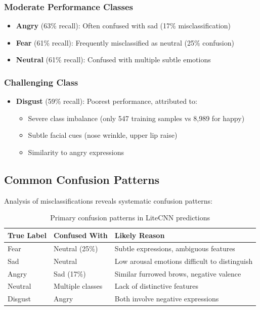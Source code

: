 \documentclass[12pt,a4paper]{article}
\begin{document}
\subsubsection{Moderate Performance Classes}
\begin{itemize}[leftmargin=*]
    \item \textbf{Angry} (63\% recall): Often confused with sad (17\% misclassification)
    \item \textbf{Fear} (61\% recall): Frequently misclassified as neutral (25\% confusion)
    \item \textbf{Neutral} (61\% recall): Confused with multiple subtle emotions
\end{itemize}

\subsubsection{Challenging Class}
\begin{itemize}[leftmargin=*]
    \item \textbf{Disgust} (59\% recall): Poorest performance, attributed to:
    \begin{itemize}
        \item Severe class imbalance (only 547 training samples vs 8,989 for happy)
        \item Subtle facial cues (nose wrinkle, upper lip raise)
        \item Similarity to angry expressions
    \end{itemize}
\end{itemize}

\subsection{Common Confusion Patterns}
Analysis of misclassifications reveals systematic confusion patterns:

\begin{table}[h!]
\centering
\begin{tabular}{lll}
\toprule
True Label & Confused With & Likely Reason \\
\midrule
Fear & Neutral (25\%) & Subtle expressions, ambiguous features \\
Sad & Neutral & Low arousal emotions difficult to distinguish \\
Angry & Sad (17\%) & Similar furrowed brows, negative valence \\
Neutral & Multiple classes & Lack of distinctive features \\
Disgust & Angry & Both involve negative expressions \\
\bottomrule
\end{tabular}
\caption{Primary confusion patterns in LiteCNN predictions}
\label{tab:confusion_patterns}
\end{table}
\end{document}
